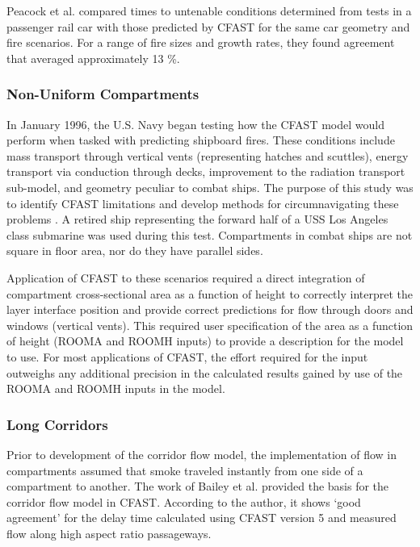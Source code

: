 Peacock et al. \cite{Peacock:2004} compared times to untenable conditions determined from tests in a
passenger rail car with those predicted by CFAST for the same car geometry and fire scenarios.
For a range of fire sizes and growth rates, they found agreement that averaged approximately
13 \%.

\subsubsection{Non-Uniform Compartments}

In January 1996, the U.S. Navy began testing how the CFAST model would perform when tasked with predicting shipboard fires. These conditions include mass transport through vertical vents (representing hatches and scuttles), energy transport via conduction through decks, improvement to the radiation transport sub-model, and geometry peculiar to combat ships. The purpose of this study was to identify CFAST limitations and develop methods for circumnavigating these problems \cite{Hoover:2001}. A retired ship representing the forward half of a {USS} Los Angeles class submarine was used during this test. Compartments in combat ships are not square in floor area, nor do they have parallel sides.

Application of CFAST to these scenarios required a direct integration of compartment cross-sectional area as a function of height to correctly interpret the layer interface position and provide correct predictions for flow through doors and windows (vertical vents). This required user specification of the area as a function of height (ROOMA and ROOMH inputs) to provide a description for the model to use. For most applications of CFAST, the effort required for the input outweighs any additional precision in the calculated results gained by use of the ROOMA and ROOMH inputs in the model.

\subsubsection{Long Corridors}

Prior to development of the corridor flow model, the implementation of flow in compartments assumed that smoke traveled instantly from one side of a compartment to another. The work of Bailey et al. \cite{Bailey:2002} provided the basis for the corridor flow model in CFAST. According to the author, it shows `good agreement' for the delay time calculated using CFAST version 5 and measured flow along high aspect ratio passageways.

